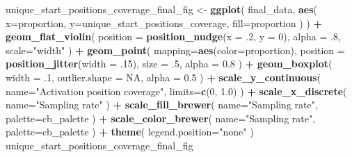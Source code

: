 \documentclass[]{book}
\newenvironment{Shaded}{\begin{snugshade}}{\end{snugshade}}
\newcommand{\DataTypeTok}[1]{\textcolor[rgb]{0.13,0.29,0.53}{#1}}
\newcommand{\DecValTok}[1]{\textcolor[rgb]{0.00,0.00,0.81}{#1}}
\newcommand{\FloatTok}[1]{\textcolor[rgb]{0.00,0.00,0.81}{#1}}
\newcommand{\KeywordTok}[1]{\textcolor[rgb]{0.13,0.29,0.53}{\textbf{#1}}}
\newcommand{\NormalTok}[1]{#1}
\newcommand{\OperatorTok}[1]{\textcolor[rgb]{0.81,0.36,0.00}{\textbf{#1}}}
\newcommand{\OtherTok}[1]{\textcolor[rgb]{0.56,0.35,0.01}{#1}}
\newcommand{\StringTok}[1]{\textcolor[rgb]{0.31,0.60,0.02}{#1}}
\begin{document}
\begin{Shaded}
\begin{Highlighting}[]
\NormalTok{unique_start_positions_coverage_final_fig <-}\StringTok{ }\KeywordTok{ggplot}\NormalTok{(}
\NormalTok{    final_data,}
    \KeywordTok{aes}\NormalTok{(}
      \DataTypeTok{x=}\NormalTok{proportion,}
      \DataTypeTok{y=}\NormalTok{unique_start_positions_coverage,}
      \DataTypeTok{fill=}\NormalTok{proportion}
\NormalTok{    )}
\NormalTok{  ) }\OperatorTok{+}
\StringTok{  }\KeywordTok{geom_flat_violin}\NormalTok{(}
    \DataTypeTok{position =} \KeywordTok{position_nudge}\NormalTok{(}\DataTypeTok{x =} \FloatTok{.2}\NormalTok{, }\DataTypeTok{y =} \DecValTok{0}\NormalTok{),}
    \DataTypeTok{alpha =} \FloatTok{.8}\NormalTok{,}
    \DataTypeTok{scale=}\StringTok{"width"}
\NormalTok{  ) }\OperatorTok{+}
\StringTok{  }\KeywordTok{geom_point}\NormalTok{(}
    \DataTypeTok{mapping=}\KeywordTok{aes}\NormalTok{(}\DataTypeTok{color=}\NormalTok{proportion),}
    \DataTypeTok{position =} \KeywordTok{position_jitter}\NormalTok{(}\DataTypeTok{width =} \FloatTok{.15}\NormalTok{),}
    \DataTypeTok{size =} \FloatTok{.5}\NormalTok{,}
    \DataTypeTok{alpha =} \FloatTok{0.8}
\NormalTok{  ) }\OperatorTok{+}
\StringTok{  }\KeywordTok{geom_boxplot}\NormalTok{(}
    \DataTypeTok{width =} \FloatTok{.1}\NormalTok{,}
    \DataTypeTok{outlier.shape =} \OtherTok{NA}\NormalTok{,}
    \DataTypeTok{alpha =} \FloatTok{0.5}
\NormalTok{  ) }\OperatorTok{+}
\StringTok{  }\KeywordTok{scale_y_continuous}\NormalTok{(}
    \DataTypeTok{name=}\StringTok{"Activation position coverage"}\NormalTok{,}
    \DataTypeTok{limits=}\KeywordTok{c}\NormalTok{(}\DecValTok{0}\NormalTok{, }\FloatTok{1.0}\NormalTok{)}
\NormalTok{  ) }\OperatorTok{+}
\StringTok{  }\KeywordTok{scale_x_discrete}\NormalTok{(}
    \DataTypeTok{name=}\StringTok{"Sampling rate"}
\NormalTok{  ) }\OperatorTok{+}
\StringTok{  }\KeywordTok{scale_fill_brewer}\NormalTok{(}
    \DataTypeTok{name=}\StringTok{"Sampling rate"}\NormalTok{,}
    \DataTypeTok{palette=}\NormalTok{cb_palette}
\NormalTok{  ) }\OperatorTok{+}
\StringTok{  }\KeywordTok{scale_color_brewer}\NormalTok{(}
    \DataTypeTok{name=}\StringTok{"Sampling rate"}\NormalTok{,}
    \DataTypeTok{palette=}\NormalTok{cb_palette}
\NormalTok{  ) }\OperatorTok{+}
\StringTok{  }\KeywordTok{theme}\NormalTok{(}
    \DataTypeTok{legend.position=}\StringTok{"none"}
\NormalTok{  )}
\NormalTok{unique_start_positions_coverage_final_fig}
\end{Highlighting}
\end{Shaded}
\end{document}
